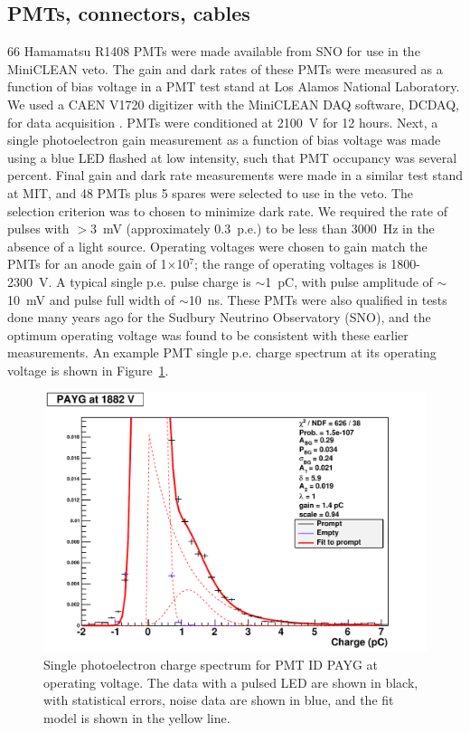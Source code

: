 \documentclass[review,number,sort&compress]{elsarticle}
\begin{document}
\subsection{PMTs, connectors, cables}
\label{sec:pmts}
%
66 Hamamatsu R1408 PMTs were made available from SNO for use in the MiniCLEAN
veto. The gain and dark rates of these PMTs were measured as a
function of bias voltage in a PMT test stand at Los Alamos National
Laboratory. We used a CAEN V1720 digitizer with the MiniCLEAN DAQ
software, DCDAQ, for data acquisition \cite{ref:gastler_thesis}. PMTs were conditioned at 2100~V
for 12 hours. Next, a single photoelectron gain measurement as a
function of bias voltage was made using a blue LED flashed at low
intensity, such that PMT occupancy was several percent. Final gain and
dark rate measurements were made in a similar test stand at MIT, and
48 PMTs plus 5 spares were selected to use in the veto. The selection
criterion was to chosen to minimize dark rate. We required the rate of pulses with
$>$3~mV (approximately 0.3~p.e.) to be less than 3000~Hz in the
absence of a light source. Operating voltages were chosen to gain
match the PMTs for an anode gain of 1$\times$10$^7$; the range of
operating voltages is 1800-2300~V. A typical single p.e. pulse charge
is $\sim$1~pC, with pulse amplitude of $\sim$10~mV and pulse full width of
$\sim$10~ns. These PMTs were also qualified in tests done many years ago for
the Sudbury Neutrino Observatory (SNO), and the optimum operating voltage was
found to be consistent with these earlier measurements.
An example PMT single p.e. charge spectrum at its operating voltage is
shown in Figure~\ref{fig:pmt_spe_q}.

\begin{figure}[ht]
\begin{center}
\includegraphics[width=4.5in]{graphics/PAYG_singlePE.pdf}
\caption{Single photoelectron charge spectrum for PMT ID PAYG at operating voltage. The data with a pulsed LED are shown in black, with statistical errors, noise data are shown in blue, and the fit model is shown in the yellow line.
\label{fig:pmt_spe_q}}
\end{center}
\end{figure}
\end{document}
